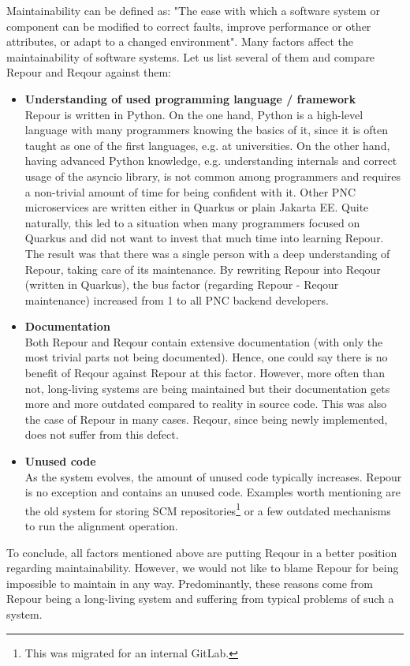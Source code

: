 \documentclass[../main.tex]{subfiles}
\begin{document}
Maintainability can be defined as: "The ease with which a software system or component can be modified to correct faults, improve performance
or other attributes, or adapt to a changed environment"\cite{software-glossary}. Many factors affect the maintainability of software systems. Let us list several of them and compare Repour and Reqour against them:
\begin{itemize}
    \item \textbf{Understanding of used programming language / framework}\\
    Repour is written in Python. On the one hand, Python is a high-level language with many programmers knowing the basics of it, since it is often taught as one of the first languages, e.g. at universities. On the other hand, having advanced Python knowledge, e.g. understanding internals and correct usage of the asyncio library, is not common among programmers and requires a non-trivial amount of time for being confident with it. Other PNC microservices are written either in Quarkus or plain Jakarta EE. Quite naturally, this led to a situation when many programmers focused on Quarkus and did not want to invest that much time into learning Repour. The result was that there was a single person with a deep understanding of Repour, taking care of its maintenance. By rewriting Repour into Reqour (written in Quarkus), the bus factor (regarding Repour - Reqour maintenance) increased from 1 to all PNC backend developers.

    \item \textbf{Documentation}\\
    Both Repour and Reqour contain extensive documentation (with only the most trivial parts not being documented). Hence, one could say there is no benefit of Reqour against Repour at this factor. However, more often than not, long-living systems are being maintained but their documentation gets more and more outdated compared to reality in source code. This was also the case of Repour in many cases. Reqour, since being newly implemented, does not suffer from this defect.

    \item \textbf{Unused code}\\
    As the system evolves, the amount of unused code typically increases. Repour is no exception and contains an unused code. Examples worth mentioning are the old system for storing SCM repositories\footnote{This was migrated for an internal GitLab.} or a few outdated mechanisms to run the alignment operation.
\end{itemize}

To conclude, all factors mentioned above are putting Reqour in a better position regarding maintainability. However, we would not like to blame Repour for being impossible to maintain in any way. Predominantly, these reasons come from Repour being a long-living system and suffering from typical problems of such a system.
\end{document}
